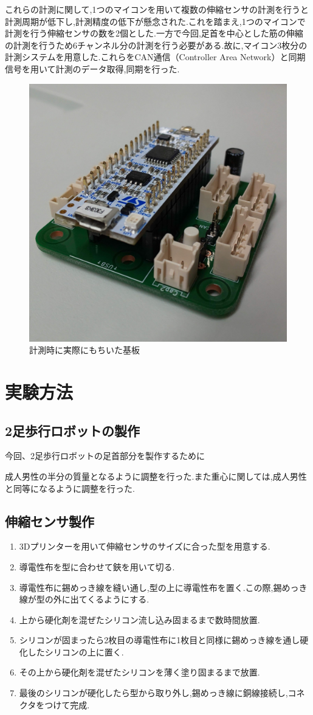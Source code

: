 これらの計測に関して,1つのマイコンを用いて複数の伸縮センサの計測を行うと計測周期が低下し,計測精度の低下が懸念された.これを踏まえ,1つのマイコンで計測を行う伸縮センサの数を2個とした.一方で今回,足首を中心とした筋の伸縮の計測を行うため6チャンネル分の計測を行う必要がある.故に,マイコン3枚分の計測システムを用意した.これらをCAN通信（Controller Area Network）と同期信号を用いて計測のデータ取得,同期を行った.
\begin{figure}[h]
 \begin{center}
  \includegraphics[width=0.5\columnwidth,clip]{Photo/BackGround/circuit.eps}
  \caption{計測時に実際にもちいた基板}
  \label{circuit}
 \end{center}
\end{figure}

\section{実験方法}
\subsection{2足歩行ロボットの製作}
今回、2足歩行ロボットの足首部分を製作するために

成人男性の半分の質量となるように調整を行った.また重心に関しては,成人男性と同等になるように調整を行った.
\subsection{伸縮センサ製作}
\begin{enumerate}
    \item 3Dプリンターを用いて伸縮センサのサイズに合った型を用意する.
    \item 導電性布を型に合わせて鋏を用いて切る.
    \item 導電性布に錫めっき線を縫い通し,型の上に導電性布を置く.この際,錫めっき線が型の外に出てくるようにする.
    \item 上から硬化剤を混ぜたシリコン流し込み固まるまで数時間放置.
    \item シリコンが固まったら2枚目の導電性布に1枚目と同様に錫めっき線を通し硬化したシリコンの上に置く.
    \item その上から硬化剤を混ぜたシリコンを薄く塗り固まるまで放置.
    \item 最後のシリコンが硬化したら型から取り外し,錫めっき線に銅線接続し,コネクタをつけて完成.
\end{enumerate}
